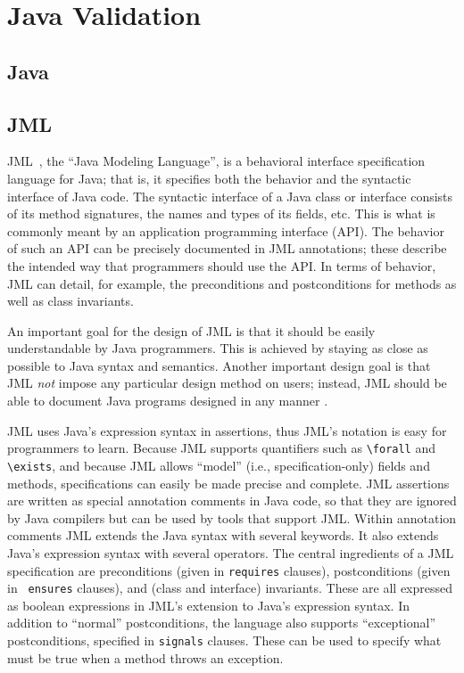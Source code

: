 \chapter{Java Validation}
\section{Java}
\section{JML}
JML~\cite{Leavens-Baker-Ruby99b,Leavens-Baker-Ruby03}, the
``Java Modeling Language'', is a behavioral interface
specification language for Java; that is, it specifies both the behavior
and the syntactic interface of Java code.  The syntactic interface of
a Java class or interface consists of its method signatures,
the names and types of its fields, etc.
This is what is commonly meant by an application programming
interface (API).
The behavior of such an API can be precisely documented in JML annotations;
these describe the intended way that programmers should
use the API.  In terms of behavior, JML can detail, for example, the
preconditions and postconditions for methods as well as class
invariants.

An important goal for the design of JML is that it should be easily
understandable by Java programmers. This is achieved by staying as
close as possible to Java syntax and semantics.  Another important
design goal is that JML {\em not} impose any particular design method
on users; instead, JML should be able to document Java programs
designed in any manner \cite{Leavens-Baker-Ruby03}.

JML uses Java's expression syntax in assertions,
thus JML's notation is easy for programmers to learn.  
Because JML supports quantifiers such as
\verb_\forall_ and \verb_\exists_, and because JML allows ``model''
(i.e., specification-only) fields and methods, specifications can
easily be made precise and complete.
JML assertions are written as special
annotation comments in Java code,
so that they are ignored by Java compilers but can be used
by tools that support JML\@.  Within annotation comments JML extends the
Java syntax with several keywords.  It also extends Java's expression syntax with several
operators.
The central ingredients of a JML specification are preconditions
(given in {\tt requires} clauses), postconditions (given in {\tt
  ensures} clauses), and (class and interface) invariants.  These are
all expressed as boolean expressions in JML's extension to Java's
expression syntax.
In addition to ``normal'' postconditions, the language also supports
``exceptional'' postconditions, specified in {\tt signals} clauses.
These can be used to specify what must be true when a method throws an
exception. 

